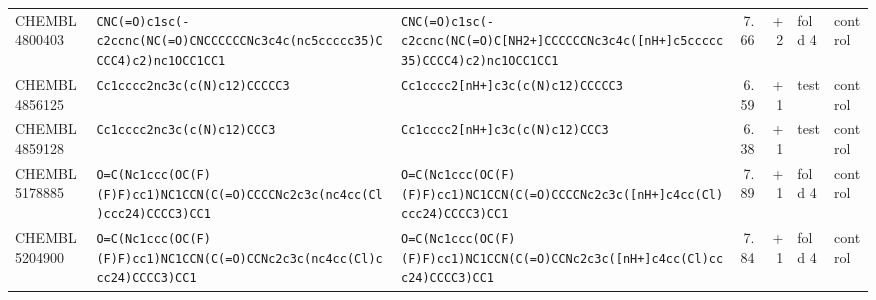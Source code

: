 \begin{longtable}{l p{4.4cm} p{4.4cm} r r l l}
CHEMBL4800403 & \texttt{CNC(\allowbreak{}=\allowbreak{}O)\allowbreak{}c1sc(\allowbreak{}-c2ccnc(\allowbreak{}NC(\allowbreak{}=\allowbreak{}O)\allowbreak{}CNCCCCCCNc3c4c(\allowbreak{}nc5ccccc35)\allowbreak{}CCCC4)\allowbreak{}c2)\allowbreak{}nc1OCC1CC1} & \texttt{CNC(\allowbreak{}=\allowbreak{}O)\allowbreak{}c1sc(\allowbreak{}-c2ccnc(\allowbreak{}NC(\allowbreak{}=\allowbreak{}O)\allowbreak{}C[NH2+]\allowbreak{}CCCCCCNc3c4c(\allowbreak{}[nH+]\allowbreak{}c5ccccc35)\allowbreak{}CCCC4)\allowbreak{}c2)\allowbreak{}nc1OCC1CC1} & 7.66 & +2 & fold 4 & control \\
CHEMBL4856125 & \texttt{Cc1cccc2nc3c(\allowbreak{}c(\allowbreak{}N)\allowbreak{}c12)\allowbreak{}CCCCC3} & \texttt{Cc1cccc2[nH+]\allowbreak{}c3c(\allowbreak{}c(\allowbreak{}N)\allowbreak{}c12)\allowbreak{}CCCCC3} & 6.59 & +1 & test & control \\
CHEMBL4859128 & \texttt{Cc1cccc2nc3c(\allowbreak{}c(\allowbreak{}N)\allowbreak{}c12)\allowbreak{}CCC3} & \texttt{Cc1cccc2[nH+]\allowbreak{}c3c(\allowbreak{}c(\allowbreak{}N)\allowbreak{}c12)\allowbreak{}CCC3} & 6.38 & +1 & test & control \\
CHEMBL5178885 & \texttt{O=\allowbreak{}C(\allowbreak{}Nc1ccc(\allowbreak{}OC(\allowbreak{}F)\allowbreak{}(\allowbreak{}F)\allowbreak{}F)\allowbreak{}cc1)\allowbreak{}NC1CCN(\allowbreak{}C(\allowbreak{}=\allowbreak{}O)\allowbreak{}CCCCNc2c3c(\allowbreak{}nc4cc(\allowbreak{}Cl)\allowbreak{}ccc24)\allowbreak{}CCCC3)\allowbreak{}CC1} & \texttt{O=\allowbreak{}C(\allowbreak{}Nc1ccc(\allowbreak{}OC(\allowbreak{}F)\allowbreak{}(\allowbreak{}F)\allowbreak{}F)\allowbreak{}cc1)\allowbreak{}NC1CCN(\allowbreak{}C(\allowbreak{}=\allowbreak{}O)\allowbreak{}CCCCNc2c3c(\allowbreak{}[nH+]\allowbreak{}c4cc(\allowbreak{}Cl)\allowbreak{}ccc24)\allowbreak{}CCCC3)\allowbreak{}CC1} & 7.89 & +1 & fold 4 & control \\
CHEMBL5204900 & \texttt{O=\allowbreak{}C(\allowbreak{}Nc1ccc(\allowbreak{}OC(\allowbreak{}F)\allowbreak{}(\allowbreak{}F)\allowbreak{}F)\allowbreak{}cc1)\allowbreak{}NC1CCN(\allowbreak{}C(\allowbreak{}=\allowbreak{}O)\allowbreak{}CCNc2c3c(\allowbreak{}nc4cc(\allowbreak{}Cl)\allowbreak{}ccc24)\allowbreak{}CCCC3)\allowbreak{}CC1} & \texttt{O=\allowbreak{}C(\allowbreak{}Nc1ccc(\allowbreak{}OC(\allowbreak{}F)\allowbreak{}(\allowbreak{}F)\allowbreak{}F)\allowbreak{}cc1)\allowbreak{}NC1CCN(\allowbreak{}C(\allowbreak{}=\allowbreak{}O)\allowbreak{}CCNc2c3c(\allowbreak{}[nH+]\allowbreak{}c4cc(\allowbreak{}Cl)\allowbreak{}ccc24)\allowbreak{}CCCC3)\allowbreak{}CC1} & 7.84 & +1 & fold 4 & control \\

\end{longtable}
